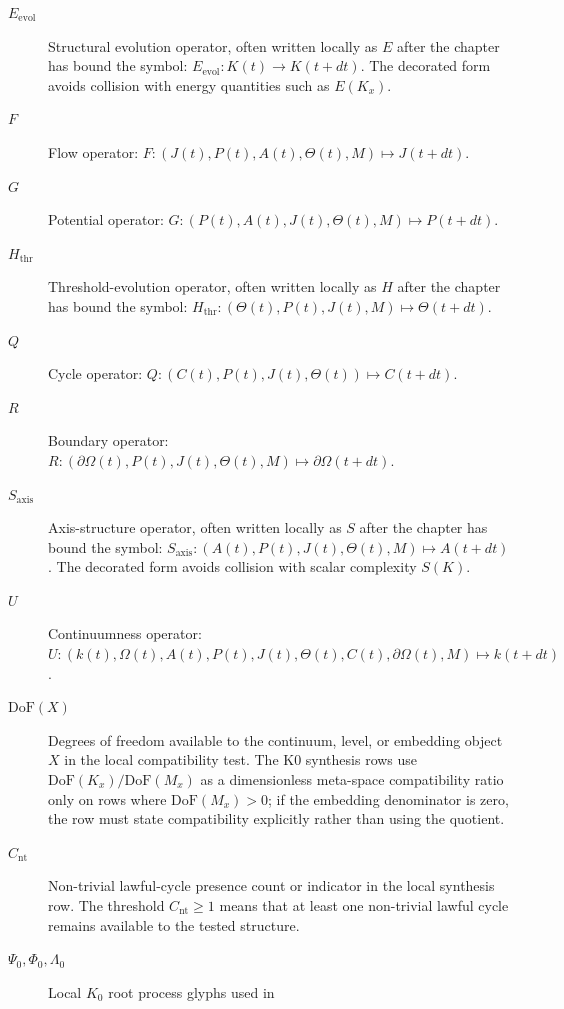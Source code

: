 \begin{description}
  \item[\(E_{\mathrm{evol}}\)] Structural evolution operator, often written
        locally as \(E\) after the chapter has bound the symbol:
        \(E_{\mathrm{evol}}: K(t) \to K(t+dt)\). The decorated form avoids
        collision with energy quantities such as \(E(K_x)\).
  \item[\(F\)] Flow operator:
        \(F:(J(t),P(t),A(t),\Theta(t),M)\mapsto J(t+dt)\).
  \item[\(G\)] Potential operator:
        \(G:(P(t),A(t),J(t),\Theta(t),M)\mapsto P(t+dt)\).
  \item[\(H_{\mathrm{thr}}\)] Threshold-evolution operator, often written
        locally as \(H\) after the chapter has bound the symbol:
        \(H_{\mathrm{thr}}:(\Theta(t),P(t),J(t),M)\mapsto \Theta(t+dt)\).
  \item[\(Q\)] Cycle operator:
        \(Q:(C(t),P(t),J(t),\Theta(t))\mapsto C(t+dt)\).
  \item[\(R\)] Boundary operator:
        \(R:(\partial\Omega(t),P(t),J(t),\Theta(t),M)\mapsto
        \partial\Omega(t+dt)\).
  \item[\(S_{\mathrm{axis}}\)] Axis-structure operator, often written locally
        as \(S\) after the chapter has bound the symbol:
        \(S_{\mathrm{axis}}:(A(t),P(t),J(t),\Theta(t),M)\mapsto A(t+dt)\).
        The decorated form avoids collision with scalar complexity \(S(K)\).
  \item[\(U\)] Continuumness operator:
        \(U:(k(t),\Omega(t),A(t),P(t),J(t),\Theta(t),C(t),
        \partial\Omega(t),M)\mapsto k(t+dt)\).
  \item[\(\mathrm{DoF}(X)\)] Degrees of freedom available to the continuum,
        level, or embedding object \(X\) in the local compatibility test.
        The K0 synthesis rows use \(\mathrm{DoF}(K_x)/\mathrm{DoF}(M_x)\)
        as a dimensionless meta-space compatibility ratio only on rows where
        \(\mathrm{DoF}(M_x)>0\); if the embedding denominator is zero, the row
        must state compatibility explicitly rather than using the quotient.
  \item[\(C_{\mathrm{nt}}\)] Non-trivial lawful-cycle presence count or
        indicator in the local synthesis row. The threshold
        \(C_{\mathrm{nt}}\geq 1\) means that at least one non-trivial lawful
        cycle remains available to the tested structure.
  \item[\(\Psi_0,\Phi_0,\Lambda_0\)] Local \(K_0\) root process glyphs used in

\end{description}
